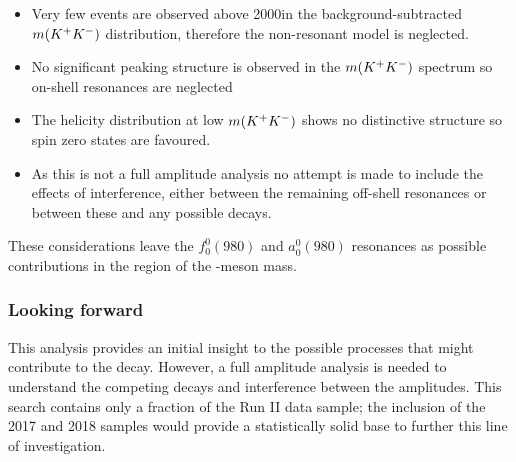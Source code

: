 \begin{itemize}
\item Very few events are observed above 2000\mevcc in the background-subtracted $m({{K}^+}{{K}^-})$ distribution, therefore the non-resonant model is neglected.
\item No significant peaking structure is observed in the $m({{K}^+}{{K}^-})$ spectrum so on-shell resonances are neglected
\item The helicity distribution at low $m({{K}^+}{{K}^-})$ shows no distinctive structure so spin zero states are favoured.  
\item As this is not a full amplitude analysis no attempt is made to include the effects of interference, either between the remaining off-shell resonances or between these and any possible \decay{\Bp}{\Dsp\phiz} decays.
\end{itemize}

These considerations leave the $f_{0}^{0}(980)$ and $a_{0}^{0}(980)$ resonances as possible contributions in the region of the \phiz-meson mass. 



\subsubsection{Looking forward}

This analysis provides an initial insight to the possible processes that might contribute to the \decay{\Bp}{\Dsp\Kp\Km} decay. However, a full amplitude analysis is needed to understand the competing decays and interference between the amplitudes. This search contains only a fraction of the Run II data sample; the inclusion of the 2017 and 2018 samples would provide a statistically solid base to further this line of investigation. 

